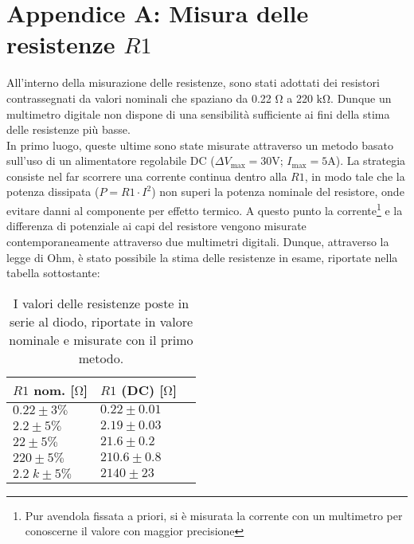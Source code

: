 \documentclass{article}[a4paper, oneside, 11pt]
\begin{document}
\section{Appendice A: Misura delle resistenze $R1$}\label{app: A}

All’interno della misurazione delle resistenze, sono stati adottati dei
resistori contrassegnati da valori nominali che spaziano da 0.22 $\si{\ohm}$
a 220 $\si{\kohm}$. Dunque un multimetro digitale non dispone di una sensibilit\`a
sufficiente ai fini della stima delle resistenze pi\`u basse.\\  
In primo luogo, queste ultime sono state misurate attraverso un metodo basato
sull'uso di un alimentatore regolabile DC ($\Delta V_{\text{max}} = 30
\si{\V}$; $I_{\text{max}} = 5 \si{\A}$). La strategia consiste nel far
scorrere una corrente continua dentro alla $R1$, in modo tale che la potenza
dissipata ($P = R1 \cdot I^2$) non superi la potenza nominale del resistore,
onde evitare danni al componente per effetto termico.
A questo punto la corrente\footnote{Pur avendola fissata a priori, si \`e misurata
la corrente con un multimetro per conoscerne il valore con maggior precisione}
e la differenza di potenziale ai capi del resistore vengono misurate
contemporaneamente attraverso due multimetri digitali. 
Dunque, attraverso la legge di Ohm, \`e stato possibile la stima delle resistenze
in esame, riportate nella tabella sottostante: 

\begin{table}[H]
	\begin{center}
		\begin{tabular}{lll}
		\toprule
		$R1$ nom. [$\si{\ohm}$] & $R1$ (DC) [$\si{\ohm}$] \\
		\midrule
		\midrule
		$0.22 \pm 3 \% $     & $0.22 \pm 0.01 $ \\
		$2.2 \pm 5 \% $     & $2.19 \pm 0.03 $ \\
		$22 \pm 5 \% $     & $21.6 \pm 0.2 $ \\
		$220 \pm 5 \% $     & $210.6 \pm 0.8 $ \\
		$2.2\; \si{k} \pm 5 \% $ & $2140 \pm 23$ \\
		\bottomrule
    	\end{tabular}
    \caption{I valori delle resistenze poste in serie al diodo, riportate in
        	valore nominale e misurate con il primo metodo. \label{tab:res}}
	\end{center}
\end{table}
\end{document}
